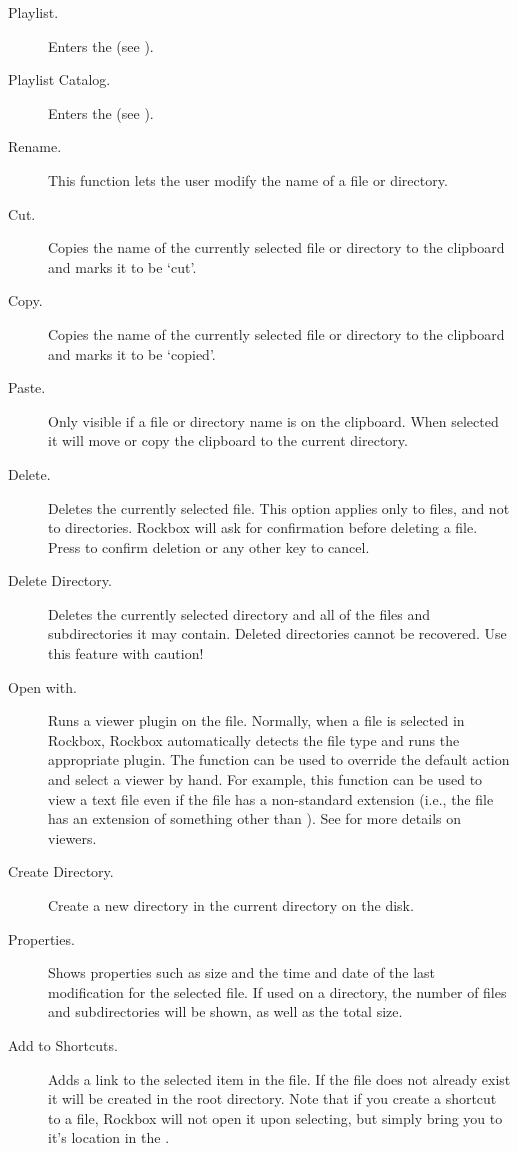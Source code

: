 \begin{description}
\item [Playlist.]
  Enters the  (see ).
\item [Playlist Catalog.]
  Enters the  (see 
  ).
\item [Rename.]
  This function lets the user modify the name of a file or directory.
\item [Cut.]
  Copies the name of the currently selected file or directory to the clipboard
  and marks it to be `cut'.
\item [Copy.]
  Copies the name of the currently selected file or directory to the clipboard
  and marks it to be `copied'.
\item [Paste.]
  Only visible if a file or directory name is on the clipboard. When selected
  it will move or copy the clipboard to the current directory.
\item [Delete.]
  Deletes the currently selected file. This option applies only to files, and
  not to directories. Rockbox will ask for confirmation before deleting a file.
  Press \ActionYesNoAccept{}
  to confirm deletion or any other key to cancel.
\item [Delete Directory.]
  Deletes the currently selected directory and all of the files and subdirectories
  it may contain. Deleted directories cannot be recovered. Use this feature with
  caution!
\item [Open with.]
  Runs a viewer plugin on the file. Normally, when a file is selected in Rockbox,
  Rockbox automatically detects the file type and runs the appropriate plugin.
  The  function can be used to override the default action and
  select a viewer by hand.
  For example, this function can be used to view a text file
  even if the file has a non-standard extension (i.e., the file has an extension
  of something other than ). See 
  for more details on viewers.
\item [Create Directory.]
  Create a new directory in the current directory on the disk.
\item [Properties.]
  Shows properties such as size and the time and date of the last modification
  for the selected file. If used on a directory, the number of files and
  subdirectories will be shown, as well as the total size.
\item [Add to Shortcuts.]
  Adds a link to the selected item in the  file.
  If the file does not already exist it will be created in the root directory.
  Note that if you create a shortcut to a file, Rockbox will not open it upon
  selecting, but simply bring you to it's location in the .
\end{description}

